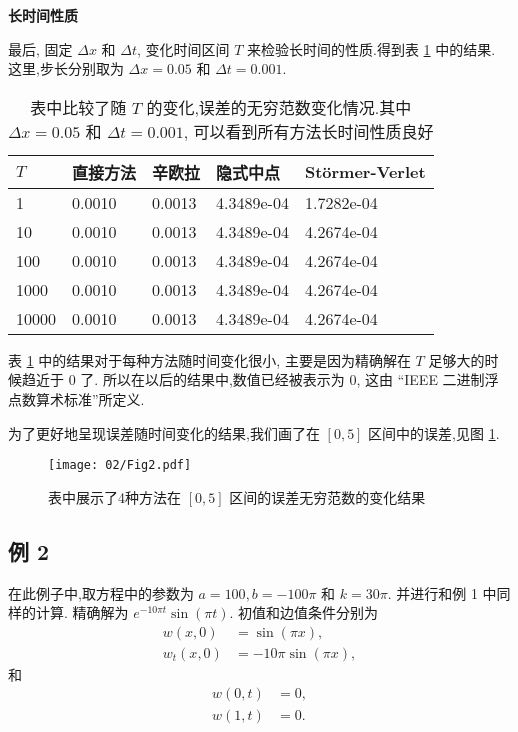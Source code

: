 \textbf{长时间性质}

最后, 固定 $\Delta x$ 和 $\Delta t$, 变化时间区间 $T$ 来检验长时间的性质.得到表 \ref{tab:t1} 中的结果. 这里,步长分别取为 $\Delta x = 0.05$ 和 $\Delta t = 0.001$.

\begin{table}[h]
  \centering
\caption{表中比较了随 $T$ 的变化,误差的无穷范数变化情况.其中 $\Delta x=0.05$ 和 $\Delta t=0.001$, 可以看到所有方法长时间性质良好}
\begin{tabularx}{\linewidth}{XXXXX}
 \toprule[1.5pt]
 $T$ &直接方法 & 辛欧拉 & 隐式中点 & St\"{o}rmer-Verlet\\
 \midrule[1pt]
 1 & 0.0010 & 0.0013 & 4.3489e-04 & 1.7282e-04 \\
 10 & 0.0010 & 0.0013 & 4.3489e-04 & 4.2674e-04 \\
 100 & 0.0010 & 0.0013 & 4.3489e-04 & 4.2674e-04 \\
 1000 & 0.0010 & 0.0013 & 4.3489e-04 & 4.2674e-04 \\
 10000 & 0.0010 & 0.0013 & 4.3489e-04 & 4.2674e-04 \\
 \bottomrule[1.5pt]
\end{tabularx}
  \label{tab:t1}
\end{table}

表 \ref{tab:t1} 中的结果对于每种方法随时间变化很小, 主要是因为精确解在 $T$ 足够大的时候趋近于 $0$ 了. 所以在以后的结果中,数值已经被表示为 $0$, 这由 ``IEEE 二进制浮点数算术标准''所定义.

为了更好地呈现误差随时间变化的结果,我们画了在 $[0,5]$ 区间中的误差,见图 \ref{fig:err1}.

\begin{figure}[h]
    \centering
    \texttt{[image: 02/Fig2.pdf]}
    \caption{表中展示了4种方法在 $[0,5]$ 区间的误差无穷范数的变化结果}
    \label{fig:err1}
\end{figure}


\subsection*{例 2}
在此例子中,取方程中的参数为 $a = 100, b
=-100\pi$ 和 $k =30\pi$. 并进行和例 1 中同样的计算.
精确解为 $e^{-10\pi t}\sin(\pi t)$. 初值和边值条件分别为
\begin{equation*}
\begin{aligned}
w(x,0)&=\sin(\pi x),\\
w_t(x,0)&=-10 \pi \sin(\pi x),
\end{aligned}
\end{equation*}
和
\begin{equation*}
\begin{aligned}
w(0,t)&=0,\\
w(1,t)&=0.
\end{aligned}
\end{equation*}

